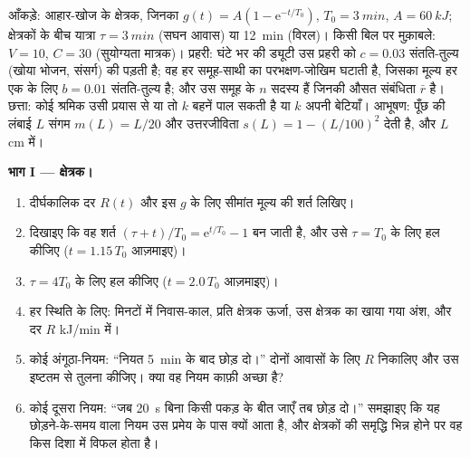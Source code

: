 \begin{problem}
\label{pb:b3:behavioural-ecology:1}
आँकड़े: आहार-खोज के क्षेत्रक, जिनका $g(t) = A(1 - \mathrm{e}^{-t/T_{0}})$, $T_{0}
= \qty{3}{min}$, $A = \qty{60}{kJ}$; क्षेत्रकों के बीच यात्रा $\tau =
\qty{3}{min}$ (सघन आवास) या \qty{12}{min} (विरल)। किसी बिल पर
मुक़ाबले: $V = 10$, $C = 30$ (सुयोग्यता मात्रक)। प्रहरी: घंटे भर की ड्यूटी
उस प्रहरी को $c = 0.03$ संतति-तुल्य (खोया भोजन, संसर्ग) की पड़ती है; वह
हर समूह-साथी का परभक्षण-जोखिम घटाती है, जिसका मूल्य हर एक के लिए
$b = 0.01$ संतति-तुल्य है; और उस समूह के $n$ सदस्य हैं जिनकी औसत
संबंधिता $\bar r$ है। छत्ता: कोई श्रमिक उसी प्रयास से या तो $k$ बहनें
पाल सकती है या $k$ अपनी बेटियाँ। आभूषण: पूँछ की लंबाई $L$ संगम
$m(L) = L/20$ और उत्तरजीविता $s(L) = 1 - (L/100)^{2}$ देती है, और $L$
cm में।

\medskip
\noindent\textbf{भाग I --- क्षेत्रक।}
\begin{enumerate}
  \item दीर्घकालिक दर $R(t)$ और इस $g$ के लिए सीमांत मूल्य की शर्त
        लिखिए।
  \item दिखाइए कि वह शर्त $(\tau + t)/T_{0} = \mathrm{e}^{t/T_{0}}
        - 1$ बन जाती है, और उसे $\tau = T_{0}$ के लिए हल कीजिए
        ($t = 1.15\,T_{0}$ आज़माइए)।
  \item $\tau = 4T_{0}$ के लिए हल कीजिए ($t = 2.0\,T_{0}$ आज़माइए)।
  \item हर स्थिति के लिए: मिनटों में निवास-काल, प्रति क्षेत्रक ऊर्जा,
        उस क्षेत्रक का खाया गया अंश, और दर $R$ kJ/min में।
  \item कोई अंगूठा-नियम: ``नियत \qty{5}{min} के बाद छोड़ दो।'' दोनों
        आवासों के लिए $R$ निकालिए और उस इष्टतम से तुलना कीजिए। क्या वह
        नियम काफ़ी अच्छा है?
  \item कोई दूसरा नियम: ``जब \qty{20}{s} बिना किसी पकड़ के बीत जाएँ तब
        छोड़ दो।'' समझाइए कि यह छोड़ने-के-समय वाला नियम उस प्रमेय के
        पास क्यों आता है, और क्षेत्रकों की समृद्धि भिन्न होने पर वह किस
        दिशा में विफल होता है।
\end{enumerate}


\end{problem}
